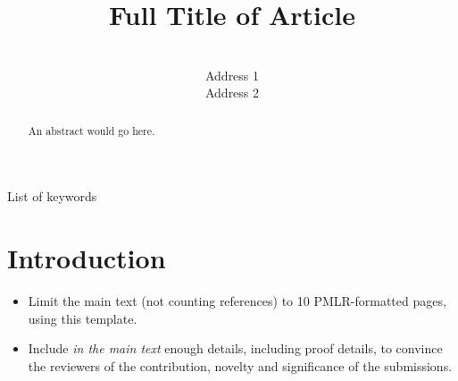 \documentclass[12pt]{l4dc2021}
\title[Short Title]{Full Title of Article}
\author{%
 \Name{Author Name1} \Email{abc@sample.com}\\
 \addr Address 1
 \AND
 \Name{Author Name2} \Email{xyz@sample.com}\\
 \addr Address 2%
}
\begin{document}
\maketitle

\begin{abstract}%
 An abstract would go here.%
\end{abstract}

\begin{keywords}%
  List of keywords%
\end{keywords}

\section{Introduction}

\begin{itemize}
  \item Limit the main text (not counting references) to 10 PMLR-formatted pages, using this template.
  \item Include {\em in the main text} enough details, including proof details, to convince the reviewers of the contribution, novelty and significance of the submissions.
\end{itemize}



\end{document}
